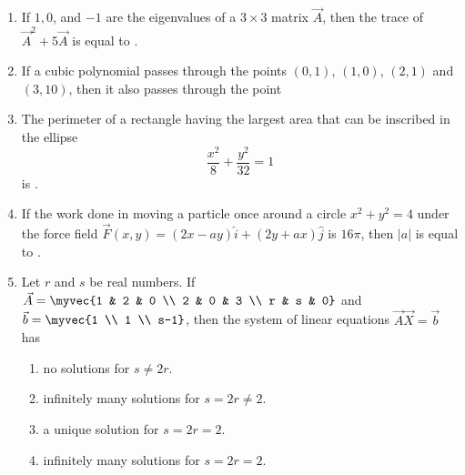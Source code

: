 \begin{enumerate}
    \item If $1, 0$, and $-1$ are the eigenvalues of a $3\times3$ matrix $\vec{A}$, then the trace of $\vec{A}^2 + 5\vec{A}$ is equal to \underline{\hspace{2cm}}.
    \hfill{}
    \item If a cubic polynomial passes through the points $(0, 1)$, $(1, 0)$, $(2, 1)$ and $(3, 10)$, then it also passes through the point
    \hfill{}
    \begin{enumerate}
    \end{enumerate}
    \item The perimeter of a rectangle having the largest area that can be inscribed in the ellipse $$\frac{x^2}{8} + \frac{y^2}{32} = 1$$ is \underline{\hspace{2cm}}.
    \hfill{}
    \item If the work done in moving a particle once around a circle $x^2 + y^2 = 4$ under the force field $\vec{F}(x,y) = (2x-ay)\hat{i} + (2y+ax)\hat{j}$ is $16\pi$, then $|a|$ is equal to \underline{\hspace{2cm}}.

    \hfill{}
    \item Let $r$ and $s$ be real numbers. If $\vec{A}= \myvec{1 & 2 & 0 \\ 2 & 0 & 3 \\ r & s & 0}$ and $\vec{b} = \myvec{1 \\ 1 \\ s-1}$, then the system of linear equations $\vec{A}\vec{X} =\vec{b}$ has
    \hfill{}
    \begin{enumerate}
        \item no solutions for $s \neq 2r$.
        \item infinitely many solutions for $s = 2r \neq 2$.
        \item a unique solution for $s = 2r = 2$.
        \item infinitely many solutions for $s = 2r = 2$.
    \end{enumerate}
\end{enumerate}
